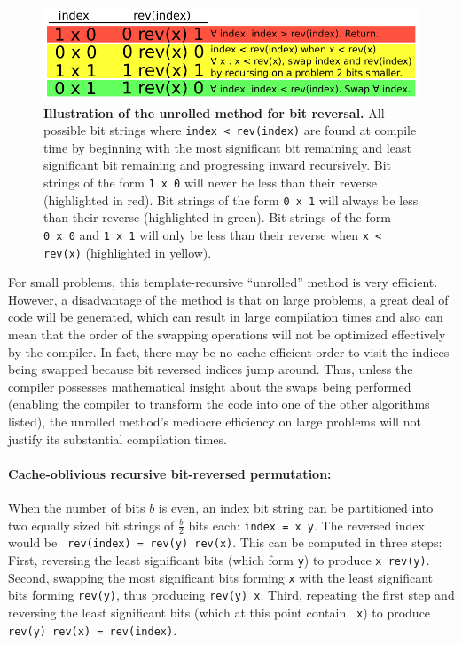 \documentclass[10pt]{article}
\begin{document}
\begin{figure}
\centering
\includegraphics[width=4.5in]{cartoons/unrolled.pdf}
\caption{{\bf Illustration of the unrolled method for bit reversal.}
  All possible bit strings where {\tt index < rev(index)} are found at
  compile time by beginning with the most significant bit remaining
  and least significant bit remaining and progressing inward
  recursively. Bit strings of the form {\tt 1~x~0} will never be less
  than their reverse (highlighted in red). Bit strings of the form
  {\tt 0~x~1} will always be less than their reverse (highlighted in
  green). Bit strings of the form {\tt 0~x~0} and {\tt 1~x~1} will
  only be less than their reverse when {\tt x < rev(x)} (highlighted
  in yellow).
  \label{figure:unrolled}}
\end{figure}

For small problems, this template-recursive ``unrolled'' method is
very efficient. However, a disadvantage of the method is that on large
problems, a great deal of code will be generated, which can result in
large compilation times and also can mean that the order of the
swapping operations will not be optimized effectively by the
compiler. In fact, there may be no cache-efficient order to visit the
indices being swapped because bit reversed indices jump around. Thus,
unless the compiler possesses mathematical insight about the swaps
being performed (enabling the compiler to transform the code into one
of the other algorithms listed), the unrolled method's mediocre
efficiency on large problems will not justify its substantial
compilation times.

\paragraph{Cache-oblivious recursive bit-reversed permutation:}

When the number of bits $b$ is even, an index bit string can be
partitioned into two equally sized bit strings of $\frac{b}{2}$ bits
each: {\tt index = x~y}. The reversed index would be {\tt
  rev(index)~=~rev(y)~rev(x)}. This can be computed in three steps:
First, reversing the least significant bits (which form {\tt y}) to
produce {\tt x~rev(y)}. Second, swapping the most significant bits
forming {\tt x} with the least significant bits forming {\tt rev(y)},
thus producing {\tt rev(y)~x}. Third, repeating the first step and
reversing the least significant bits (which at this point contain {\tt
  x}) to produce {\tt rev(y)~rev(x)~=~rev(index)}.
\end{document}

